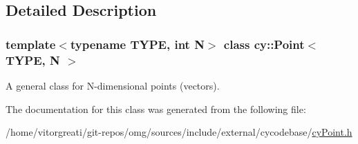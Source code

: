 \subsection{Detailed Description}
\subsubsection*{template$<$typename T\+Y\+PE, int N$>$\newline
class cy\+::\+Point$<$ T\+Y\+P\+E, N $>$}

A general class for N-\/dimensional points (vectors). 

The documentation for this class was generated from the following file\+:\begin{DoxyCompactItemize}
\item 
/home/vitorgreati/git-\/repos/omg/sources/include/external/cycodebase/\mbox{\hyperlink{cy_point_8h}{cy\+Point.\+h}}\end{DoxyCompactItemize}
